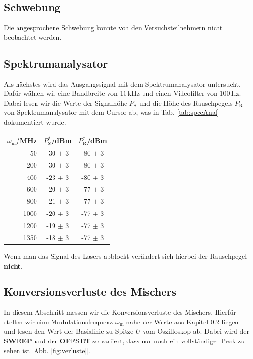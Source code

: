 \subsection{Schwebung}
\label{sub:schewbung}

Die angesprochene Schwebung konnte von den Versuchsteilnehmern nicht beobachtet werden.

\subsection{Spektrumanalysator}
\label{sub:specAnal}

Als nächstes wird das Ausgangssignal mit dem Spektrumanalysator untersucht. Dafür wählen wir eine Bandbreite von 10\,kHz und einen Videofilter von 100\,Hz. Dabei lesen wir die Werte der Signalhöhe $P_\mathrm{S}$ und die Höhe des Rauschpegels $P_\mathrm{R}$ von Spektrumanalysator mit dem Cursor ab, was in Tab. \ref{tab:specAnal} dokumentiert wurde.
\begin{center}
    \captionsetup{type=table}
    \begin{tabular}{r | c c}
        $\omega_\mathrm{m}$/MHz & $P^*_\mathrm{S}$/dBm & $P^*_\mathrm{R}$/dBm \\ \hline
        50   & -30 $\pm$ 3 & -80 $\pm$ 3 \\
        200  & -30 $\pm$ 3 & -80 $\pm$ 3 \\
        400  & -23 $\pm$ 3 & -80 $\pm$ 3 \\
        600  & -20 $\pm$ 3 & -77 $\pm$ 3 \\
        800  & -21 $\pm$ 3 & -77 $\pm$ 3 \\
        1000 & -20 $\pm$ 3 & -77 $\pm$ 3 \\
        1200 & -19 $\pm$ 3 & -77 $\pm$ 3 \\
        1350 & -18 $\pm$ 3 & -77 $\pm$ 3 \\
    \end{tabular}
    \label{tab:specAnal}
\end{center}
Wenn man das Signal des Lasers abblockt verändert sich hierbei der Rauschpegel \textbf{nicht}.

\newpage

\subsection{Konversionsverluste des Mischers}
\label{sub:verluste}

In diesem Abschnitt messen wir die Konversionsverluste des Mischers. Hierfür stellen wir eine Modulationsfrequenz $\omega_\mathrm{m}$ nahe der Werte aus Kapitel \ref{sub:specAnal} liegen und lesen den Wert der Basislinie zu Spitze $U$ vom Oszilloskop ab. Dabei wird der \textbf{SWEEP} und der \textbf{OFFSET} so variiert, dass nur noch ein vollständiger Peak zu sehen ist [Abb. \ref{fig:verluste}].

